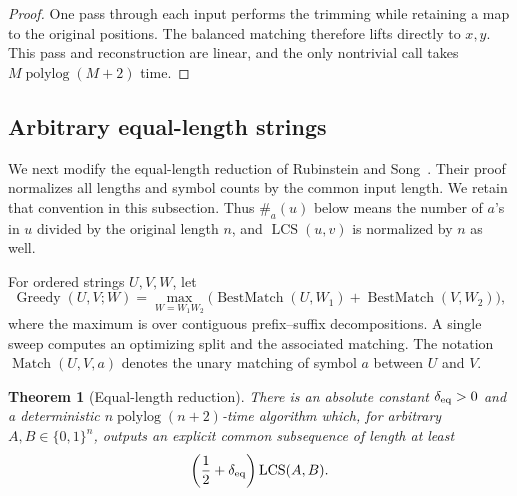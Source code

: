 \documentclass[11pt]{article}
\newtheorem{theorem}{Theorem}[section]
\theoremstyle{remark}
\newcommand{\LCS}{\operatorname{LCS}}
\newcommand{\polylog}{\operatorname{polylog}}
\newcommand{\BestMatch}{\operatorname{BestMatch}}
\newcommand{\Match}{\operatorname{Match}}
\newcommand{\Greedy}{\operatorname{Greedy}}
\begin{document}
\begin{proof}
One pass through each input performs the trimming while retaining a
map to the original positions.  The balanced matching therefore lifts
directly to $x,y$.  This pass and reconstruction are linear, and the
only nontrivial call takes $M\polylog(M+2)$ time.
\end{proof}

\subsection{Arbitrary equal-length strings}

We next modify the equal-length reduction of Rubinstein and
Song~\cite{RubinsteinSong}.  Their proof normalizes all lengths and
symbol counts by the common input length.  We retain that convention
in this subsection.  Thus $\#_a(u)$ below means the number of
$a$'s in $u$ divided by the original length $n$, and $\LCS(u,v)$ is
normalized by $n$ as well.

For ordered strings $U,V,W$, let
\[
 \Greedy(U,V;W)
 =\max_{W=W_1W_2}
   \bigl(\BestMatch(U,W_1)+\BestMatch(V,W_2)\bigr),
\]
where the maximum is over contiguous prefix--suffix decompositions.
A single sweep computes an optimizing split and the associated
matching.  The notation $\Match(U,V,a)$ denotes the unary matching of
symbol $a$ between $U$ and $V$.

\begin{theorem}[Equal-length reduction]\label{thm:equal-length}
There is an absolute constant $\delta_{\rm eq}>0$ and a deterministic
$n\polylog(n+2)$-time algorithm which, for arbitrary
$A,B\in\{0,1\}^n$, outputs an explicit common subsequence of length at
least
\[
 \left(\frac12+\delta_{\rm eq}\right)\LCS(A,B).
\]
\end{theorem}
\end{document}
